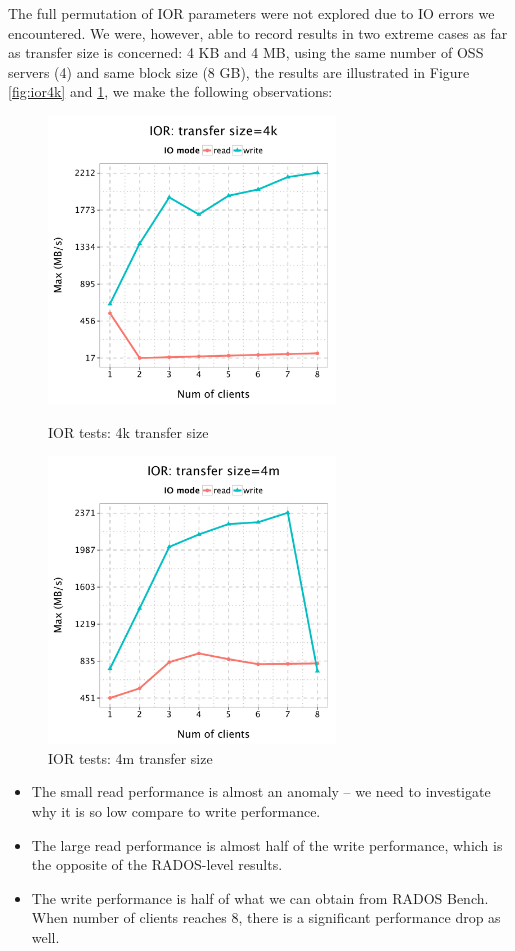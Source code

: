 \documentclass{article}
\begin{document}
The full permutation of IOR parameters were not explored due to IO errors we encountered.
We were, however, able to record results in two extreme cases as far as
transfer size is concerned: 4 KB and 4 MB, using the same number of OSS servers
(4) and same block size (8 GB), the results are illustrated in Figure
\ref{fig:ior4k} and \ref{fig:ior4m}, we make the following observations:


\begin{figure}[H]
\centering
\begin{minipage}[t]{0.5\linewidth}
\centering
\includegraphics[width=3in]{data/ior_4k}
\caption{IOR tests: 4k transfer size}
\label{fig:ior4k}
\end{minipage}%
\begin{minipage}[t]{0.5\linewidth}
\centering
\includegraphics[width=3in]{data/ior_4m}
\caption{IOR tests: 4m transfer size}
\label{fig:ior4m}
\end{minipage}%
\end{figure}


\begin{itemize}
  \item The small read performance is almost an anomaly -- we need to
  investigate why it is so low compare to write performance.
  \item The large read performance is almost half of the write performance,
  which is the opposite of the RADOS-level results. 
  \item The write performance is half of what we can obtain from
  RADOS Bench. When number of clients reaches 8, there is a significant
  performance drop as well. 
\end{itemize}
\end{document}
